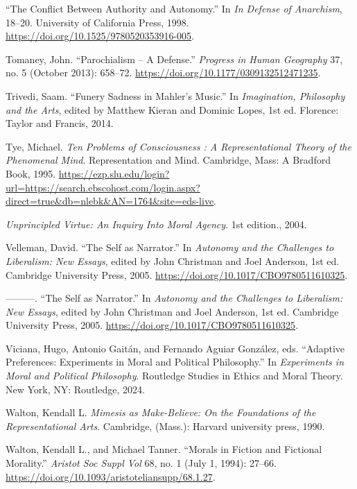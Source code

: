 \documentclass[phdthesis,12pt,final]{wuthesis}
\newlength{\cslhangindent}
\newenvironment{CSLReferences}[2] %
{\begin{list}{}{%
	\setlength{\itemindent}{0pt}
	\setlength{\leftmargin}{0pt}
	\setlength{\parsep}{0pt}
	\ifodd #1
	\setlength{\leftmargin}{\cslhangindent}
	\setlength{\itemindent}{-1\cslhangindent}
	\fi
	\setlength{\itemsep}{#2\baselineskip}}}
{\end{list}}
\theoremstyle{definition}
\theoremstyle{definition}
\theoremstyle{definition}
\theoremstyle{definition}
\theoremstyle{remark}
\begin{document}
\begin{CSLReferences}{1}{0}
{``The {Conflict Between Authority} and {Autonomy}.''} In \emph{In {Defense} of {Anarchism}}, 18--20. University of California Press, 1998. \url{https://doi.org/10.1525/9780520353916-005}.

Tomaney, John. {``Parochialism -- {A Defense}.''} \emph{Progress in Human Geography} 37, no. 5 (October 2013): 658--72. \url{https://doi.org/10.1177/0309132512471235}.

Trivedi, Saam. {``Funery {Sadness} in {Mahler}'s {Music}.''} In \emph{Imagination, {Philosophy} and the {Arts}}, edited by Matthew Kieran and Dominic Lopes, 1st ed. Florence: {Taylor and Francis}, 2014.

Tye, Michael. \emph{Ten {Problems} of {Consciousness} : {A Representational Theory} of the {Phenomenal Mind}}. Representation and {Mind}. Cambridge, Mass: A Bradford Book, 1995. \url{https://ezp.slu.edu/login?url=https://search.ebscohost.com/login.aspx?direct=true&db=nlebk&AN=1764&site=eds-live}.

\emph{Unprincipled {Virtue}: {An Inquiry Into Moral Agency}}. 1st edition., 2004.

Velleman, David. {``The {Self} as {Narrator}.''} In \emph{Autonomy and the {Challenges} to {Liberalism}: {New Essays}}, edited by John Christman and Joel Anderson, 1st ed. Cambridge University Press, 2005. \url{https://doi.org/10.1017/CBO9780511610325}.

---------. {``The {Self} as {Narrator}.''} In \emph{Autonomy and the {Challenges} to {Liberalism}: {New Essays}}, edited by John Christman and Joel Anderson, 1st ed. Cambridge University Press, 2005. \url{https://doi.org/10.1017/CBO9780511610325}.

Viciana, Hugo, Antonio Gaitán, and Fernando Aguiar González, eds. {``Adaptive {Preferences}: {Experiments} in {Moral} and {Political Philosophy}.''} In \emph{Experiments in Moral and Political Philosophy}. Routledge Studies in Ethics and Moral Theory. New York, NY: Routledge, 2024.

Walton, Kendall L. \emph{Mimesis as {Make-Believe}: {On} the {Foundations} of the {Representational Arts}}. Cambridge, (Mass.): Harvard university press, 1990.

Walton, Kendall L., and Michael Tanner. {``Morals in {Fiction} and {Fictional Morality}.''} \emph{Aristot Soc Suppl Vol} 68, no. 1 (July 1, 1994): 27--66. \url{https://doi.org/10.1093/aristoteliansupp/68.1.27}.


\end{CSLReferences}
\end{document}
